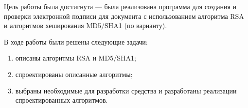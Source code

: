 
Цель работы была достигнута --- была реализована программа для создания и проверки электронной подписи для документа с использованием алгоритма RSA и алгоритмов хеширования MD5/SHA1 (по варианту).

В ходе работы были решены следующие задачи:
\begin{enumerate}
	\item описаны алгоритмы RSA и MD5/SHA1;
	\item спроектированы описанные алгоритмы;
	\item выбраны необходимые для разработки средства и разработаны реализации спроектированных алгоритмов.
\end{enumerate}